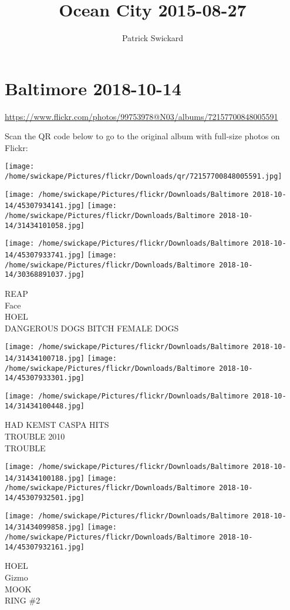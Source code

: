 \documentclass[10pt,letterpaper]{article}
\title{Ocean City 2015-08-27}
\author{Patrick Swickard}
\date{}
\begin{document}
\section*{Baltimore 2018-10-14}

\url{https://www.flickr.com/photos/99753978@N03/albums/72157700848005591}

Scan the QR code below to go to the original album with full-size photos on Flickr:

\texttt{[image: /home/swickape/Pictures/flickr/Downloads/qr/72157700848005591.jpg]}
\pagebreak

\texttt{[image: /home/swickape/Pictures/flickr/Downloads/Baltimore 2018-10-14/45307934141.jpg]}
\texttt{[image: /home/swickape/Pictures/flickr/Downloads/Baltimore 2018-10-14/31434101058.jpg]}

\texttt{[image: /home/swickape/Pictures/flickr/Downloads/Baltimore 2018-10-14/45307933741.jpg]}
\texttt{[image: /home/swickape/Pictures/flickr/Downloads/Baltimore 2018-10-14/30368891037.jpg]}

REAP\\
Face\\
HOEL\\
DANGEROUS DOGS BITCH FEMALE DOGS
\pagebreak

\texttt{[image: /home/swickape/Pictures/flickr/Downloads/Baltimore 2018-10-14/31434100718.jpg]}
\texttt{[image: /home/swickape/Pictures/flickr/Downloads/Baltimore 2018-10-14/45307933301.jpg]}

\vspace{0.25in}
\texttt{[image: /home/swickape/Pictures/flickr/Downloads/Baltimore 2018-10-14/31434100448.jpg]}

HAD KEMST CASPA HITS\\
TROUBLE 2010\\
TROUBLE
\pagebreak

\texttt{[image: /home/swickape/Pictures/flickr/Downloads/Baltimore 2018-10-14/31434100188.jpg]}
\texttt{[image: /home/swickape/Pictures/flickr/Downloads/Baltimore 2018-10-14/45307932501.jpg]}

\texttt{[image: /home/swickape/Pictures/flickr/Downloads/Baltimore 2018-10-14/31434099858.jpg]}
\texttt{[image: /home/swickape/Pictures/flickr/Downloads/Baltimore 2018-10-14/45307932161.jpg]}

HOEL\\
Gizmo\\
MOOK\\
RING \#2
\pagebreak
\end{document}
